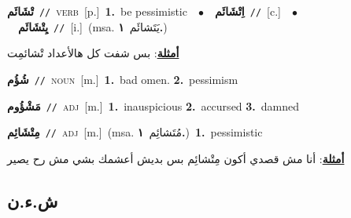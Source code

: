 \documentclass[10pt,a4paper,twoside]{article} %
\begin{document}
\begin{multicols}{2}
{\setlength\topsep{0pt}\textbf{\foreignlanguage{arabic}{تْشَائَم}}\ {\color{gray}\texttt{//}\color{black}}\ \textsc{verb}\ [p.]\ \textbf{1.}~be pessimistic\ \ $\bullet$\ \ \setlength\topsep{0pt}\textbf{\foreignlanguage{arabic}{اِتْشَائَم}}\ {\color{gray}\texttt{//}\color{black}}\ [c.]\ \ $\bullet$\ \ \setlength\topsep{0pt}\textbf{\foreignlanguage{arabic}{يِتْشَائَم}}\ {\color{gray}\texttt{//}\color{black}}\ [i.]\ \color{gray}(msa. \foreignlanguage{arabic}{يَتَشائَم}~\foreignlanguage{arabic}{\textbf{١.}})\color{black}\  \begin{flushright}\color{gray}\foreignlanguage{arabic}{\textbf{\underline{\foreignlanguage{arabic}{أمثلة}}}: بس شفت كل هالأعداد تْشائمِت}\end{flushright}\color{black}} \vspace{2mm}

{\setlength\topsep{0pt}\textbf{\foreignlanguage{arabic}{شُؤُم}}\ {\color{gray}\texttt{//}\color{black}}\ \textsc{noun}\ [m.]\ \textbf{1.}~bad omen.  \textbf{2.}~pessimism\ } \vspace{2mm}

{\setlength\topsep{0pt}\textbf{\foreignlanguage{arabic}{مَشْؤُوم}}\ {\color{gray}\texttt{//}\color{black}}\ \textsc{adj}\ [m.]\ \textbf{1.}~inauspicious  \textbf{2.}~accursed  \textbf{3.}~damned\ } \vspace{2mm}

{\setlength\topsep{0pt}\textbf{\foreignlanguage{arabic}{مِتْشَائِم}}\ {\color{gray}\texttt{//}\color{black}}\ \textsc{adj}\ [m.]\ \color{gray}(msa. \foreignlanguage{arabic}{مُتَشائِم}~\foreignlanguage{arabic}{\textbf{١.}})\color{black}\ \textbf{1.}~pessimistic\  \begin{flushright}\color{gray}\foreignlanguage{arabic}{\textbf{\underline{\foreignlanguage{arabic}{أمثلة}}}: أنا مش قصدي أكون مِتْشائِم بس بديش أعشمك بشي مش رح يصير}\end{flushright}\color{black}} \vspace{2mm}

\vspace{-3mm}
\subsection*{\color{blue}\foreignlanguage{arabic}{ش.ء.ن}\color{blue}{}} 


\end{multicols}
\end{document}
